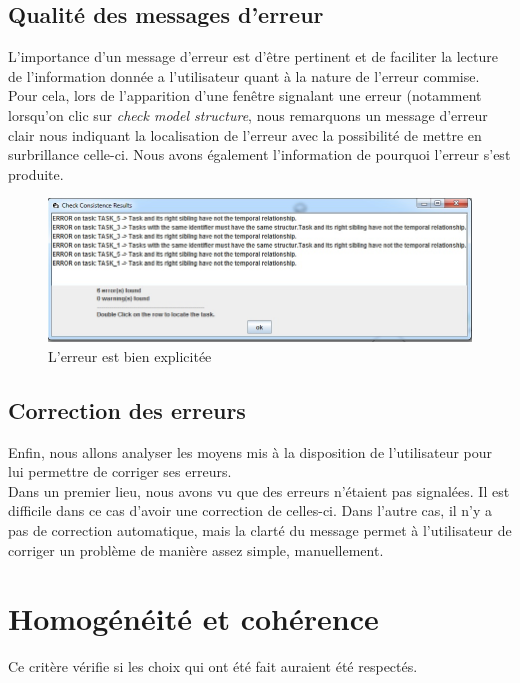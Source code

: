 \documentclass[12pt, a4paper]{article}
\begin{document}
\subsection{Qualité des messages d'erreur}
L'importance d'un message d'erreur est d'être pertinent et de faciliter la lecture de l'information donnée a l'utilisateur quant à la nature de l'erreur commise.\\


Pour cela, lors de l'apparition d'une fenêtre signalant une erreur (notamment lorsqu'on clic sur \emph{check model structure}, nous remarquons un message d'erreur clair nous indiquant la localisation de l'erreur avec la possibilité de mettre en surbrillance celle-ci. Nous avons également l'information de pourquoi l'erreur s'est produite. %

\begin{figure}[h]
\begin{center}
   \includegraphics[scale = 0.7]{erreur.jpg}
	\caption{L'erreur est bien explicitée}
	\end{center}
\end{figure}

\subsection{Correction des erreurs}
Enfin, nous allons analyser les moyens mis à la disposition de l'utilisateur pour lui permettre de corriger ses erreurs.\\


Dans un premier lieu, nous avons vu que des erreurs n'étaient pas signalées. Il est difficile dans ce cas d'avoir une correction de celles-ci. Dans l'autre cas, il n'y a pas de correction automatique, mais la clarté du message permet à l'utilisateur de corriger un problème de manière assez simple, manuellement.
\section{Homogénéité et cohérence}
Ce critère vérifie si les choix qui ont été fait auraient été respectés.\\
\end{document}
